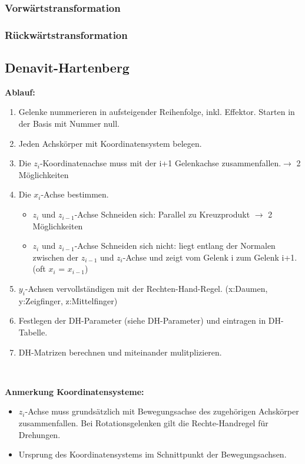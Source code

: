 \subsubsection{Vorwärtstransformation }
\subsubsection{Rückwärtstransformation }
\clearpage
\subsection{Denavit-Hartenberg }
{\small
\begin{minipage}{19cm}
    \textbf{Ablauf:}
    \begin{enumerate}{\setlength{\itemsep}{0cm}\setlength{\parsep}{0cm} \setlength{\topsep}{0cm}}
        \item Gelenke nummerieren in aufsteigender Reihenfolge, inkl. Effektor. Starten in der Basis mit Nummer null.
        \item Jeden Achskörper mit Koordinatensystem belegen.
        \item Die $z_i$-Koordinatenachse muss mit der i+1 Gelenkachse zusammenfallen.$\rightarrow$ 2 Möglichkeiten 
        \item Die $x_i$-Achse bestimmen.
        \begin{itemize}
            \item $z_i$ und $z_{i-1}$-Achse Schneiden sich: Parallel zu Kreuzprodukt $\rightarrow$ 2 Möglichkeiten 
            \item $z_i$ und $z_{i-1}$-Achse Schneiden sich nicht: liegt entlang der Normalen zwischen der $z_{i-1}$ und $z_i$-Achse und zeigt vom Gelenk i zum Gelenk i+1. (oft $x_i$ = $x_{i-1}$)
        \end{itemize}
        \item $y_i$-Achsen vervollständigen mit der Rechten-Hand-Regel. (x:Daumen, y:Zeigfinger, z:Mittelfinger)
        \item Festlegen der DH-Parameter (siehe DH-Parameter) und eintragen in DH-Tabelle.
        \item DH-Matrizen berechnen und miteinander mulitplizieren.
    \end{enumerate}
    \vspace{0.2cm}
\end{minipage}\\

\begin{minipage}{19cm}
    \textbf{Anmerkung Koordinatensysteme:}
    \begin{itemize}\itemsep0pt
        \item $z_i$-Achse muss grundsätzlich mit Bewegungsachse des zugehörigen Achskörper zusammenfallen.
        Bei Rotationsgelenken gilt die Rechte-Handregel für Drehungen. 
        \item Ursprung des Koordinatensystems im Schnittpunkt der Bewegungsachsen.
    \end{itemize}
    \vspace{0.2cm}
\end{minipage}\\
}
